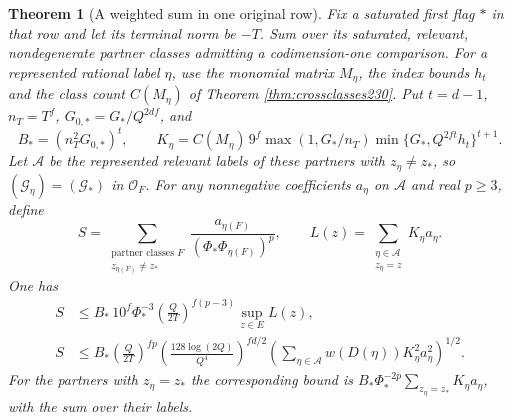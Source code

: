 \documentclass[a4paper,11pt]{article}
\newtheorem{theorem}[proposition]{Theorem}
\theoremstyle{definition}
\theoremstyle{remark}
\numberwithin{equation}{section}
\begin{document}
\begin{theorem}[A weighted sum in one original row]
\label{thm:partners230}
Fix a saturated first flag \(*\) in that row and let its
terminal norm be \(-T\). Sum over its saturated, relevant,
nondegenerate partner classes admitting a codimension-one
comparison. For a represented rational label \(\eta\), use the
monomial matrix \(M_\eta\), the index bounds \(h_t\) and the
class count \(C(M_\eta)\) of Theorem
\ref{thm:crossclasses230}.
Put \(t=d-1\), \(n_T=T^f\), \(G_{0,*}=G_*/Q^{2df}\), and
\[
 B_*=(n_T^2G_{0,*})^t,\qquad
 K_\eta=C(M_\eta)\,9^f\max(1,G_*/n_T)
                 \min\{G_*,Q^{2ft}h_t\}^{t+1}.
\]
Let \(\mathcal A\) be the represented relevant labels of these
partners with \(z_\eta\ne z_*\), so
\((\mathcal G_\eta)=(\mathcal G_*)\) in \(\mathcal O_F\).
For any nonnegative coefficients \(a_\eta\) on \(\mathcal A\)
and real \(p\ge3\), define
\[
 S=\sum_{\substack{\text{partner classes }F\\z_{\eta(F)}\ne z_*}}
     \frac{a_{\eta(F)}}{(\Phi_*\Phi_{\eta(F)})^p},
 \qquad
 L(z)=\sum_{\substack{\eta\in\mathcal A\\z_\eta=z}}K_\eta a_\eta.
\]
One has
\begin{align*}
 S&\le B_*\,10^f\Phi_*^{-3}
           \left(\frac{Q}{2T}\right)^{f(p-3)}
              \sup_{z\in E} L(z),\\
 S&\le B_*\left(\frac{Q}{2T}\right)^{fp}
       \left(\frac{128\log(2Q)}{Q^4}\right)^{fd/2}
       \left(\sum_{\eta\in\mathcal A}w(D(\eta))
                         K_\eta^2 a_\eta^2\right)^{1/2}.
\end{align*}
For the partners with \(z_\eta=z_*\) the corresponding bound is
\(B_*\Phi_*^{-2p}\sum_{z_\eta=z_*}K_\eta a_\eta\), with the
sum over their labels.
\end{theorem}
\end{document}
